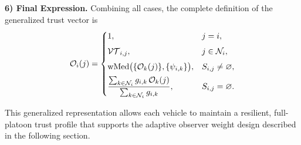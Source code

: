
\vspace{1ex}
\noindent\textbf{6) Final Expression.}
Combining all cases, the complete definition of the generalized trust vector is
\begin{equation}
\mathcal{O}_i(j) =
\begin{cases}
1, & j = i,\\[1ex]
\mathcal{VT}_{i,j}, & j \in \mathcal{N}_i,\\[1ex]
\operatorname{wMed}\bigl(\{\mathcal{O}_k(j)\}, \{\psi_{i,k}\}\bigr),
& S_{i,j} \neq \varnothing,\\[1ex]
\displaystyle
\frac{\sum_{k\in\mathcal{N}_i} g_{i,k} \, \mathcal{O}_k(j)}{\sum_{k\in\mathcal{N}_i} g_{i,k}},
& S_{i,j} = \varnothing.
\end{cases}
\label{eq:final_trust_vector}
\end{equation}

This generalized representation allows each vehicle to maintain a resilient, full-platoon trust profile that supports the adaptive observer weight design described in the following section.

